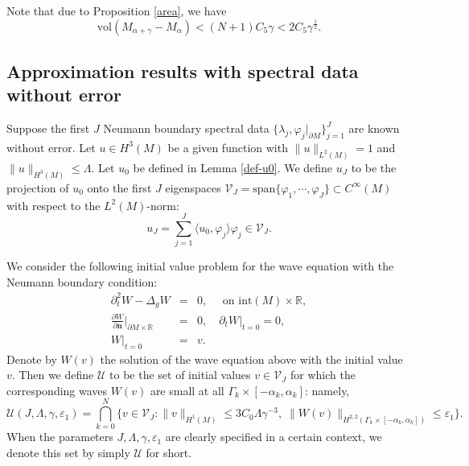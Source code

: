 \documentclass[11pt,letterpaper]{amsart}
\numberwithin{equation}{section}
\theoremstyle{definition}
\theoremstyle{plain}
\theoremstyle{definition}
\theoremstyle{plain}
\theoremstyle{definition}
\theoremstyle{plain}
\newcommand{\vol}{\textrm{vol}}
\begin{document}
Note that due to Proposition \ref{area}, we have
\begin{equation}\label{layervolume}
\vol(M_{\alpha+\gamma}-M_{\alpha})< (N+1)C_5\gamma < 2C_5\gamma^{\frac{1}{2}}.
\end{equation}

\subsection{Approximation results with spectral data without error}\hfill

\smallskip
Suppose the first $J$ Neumann boundary spectral data $\{\lambda_j,\varphi_j|_{\partial M}\}_{j=1}^{J}$ are known without error. Let $u\in H^3(M)$ be a given function with $\|u\|_{L^2(M)}=1$ and $\|u\|_{H^3(M)}\leqslant \Lambda$. Let $u_0$ be defined in Lemma \ref{def-u0}. We define $u_{J}$ to be the projection of $u_0$ onto the first $J$ eigenspaces $\mathcal{V}_{J}= \textrm{span}\{\varphi_1,\cdots,\varphi_{J}\}\subset C^{\infty}(M)$ with respect to the $L^2(M)$-norm:
\begin{equation}\label{u2}
u_{J}=\sum_{j=1}^{J}\langle u_0,\varphi_j\rangle \varphi_j \in \mathcal{V}_{J}.
\end{equation}

We consider the following initial value problem for the wave equation with the Neumann boundary condition:
\begin{eqnarray*}
\partial_t^2 W -\Delta_g W &=& 0,\quad \textrm{  on } \textrm{int}(M)\times \mathbb{R},  \\
\frac{\partial W}{\partial\mathbf{n}}\big|_{\partial M\times \mathbb{R}} &=& 0, \quad \partial_t W|_{t=0}=0,\\
W|_{t=0}&=& v.
\end{eqnarray*}
Denote by $W(v)$ the solution of the wave equation above with the initial value $v$. Then we define $\mathcal{U}$ to be the set of initial values $v\in\mathcal{V}_{J}$ for which the corresponding waves $W(v)$ are small at all $\Gamma_{k}\times[-\alpha_k,\alpha_k]$: namely,
\begin{equation}\label{Udef}
\mathcal{U}(J,\Lambda,\gamma,\varepsilon_1)=\bigcap_{k=0}^ N \big\{v\in \mathcal{V}_{J}: \|v\|_{H^1(M)}\leqslant 3C_0 \Lambda\gamma^{-3},\; \|W(v)\|_{H^{2,2}(\Gamma_{k}\times [-\alpha_k,\alpha_k])}\leqslant \varepsilon_1 \big\}.
\end{equation}
When the parameters $J,\Lambda,\gamma,\varepsilon_1$ are clearly specified in a certain context, we denote this set by simply $\mathcal{U}$ for short. 
\end{document}
